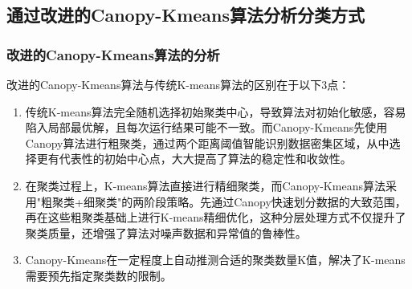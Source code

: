 \documentclass{article}
\begin{document}
	
	\subsection{通过改进的Canopy-Kmeans算法分析分类方式}
	
	\subsubsection{改进的Canopy-Kmeans算法的分析}
	
	改进的Canopy-Kmeans算法与传统K-means算法的区别在于以下3点：
	
	\begin{enumerate}[label=\arabic*.]
		\item 传统K-means算法完全随机选择初始聚类中心，导致算法对初始化敏感，容易陷入局部最优解，且每次运行结果可能不一致。而Canopy-Kmeans先使用Canopy算法进行粗聚类，通过两个距离阈值智能识别数据密集区域，从中选择更有代表性的初始中心点，大大提高了算法的稳定性和收敛性。
		
		\item 在聚类过程上，K-means算法直接进行精细聚类，而Canopy-Kmeans算法采用"粗聚类+细聚类"的两阶段策略。先通过Canopy快速划分数据的大致范围，再在这些粗聚类基础上进行K-means精细优化，这种分层处理方式不仅提升了聚类质量，还增强了算法对噪声数据和异常值的鲁棒性。
		
		\item Canopy-Kmeans在一定程度上自动推测合适的聚类数量K值，解决了K-means需要预先指定聚类数的限制。
	\end{enumerate}
	
\end{document}
